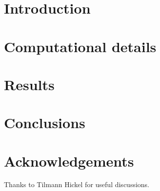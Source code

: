 

\title{\titletext}



    \maketitle

    \section{Introduction}
        \label{sec:introduction}
        

    \section{Computational details}
        \label{sec:computational}
        

    \section{Results}
        \label{sec:results}
        

    \section{Conclusions}
        \label{sec:conclusions}
        

    \section*{Acknowledgements}
        \label{sec:acknowledgement}
        Thanks to Tilmann Hickel for useful discussions.

    
    

